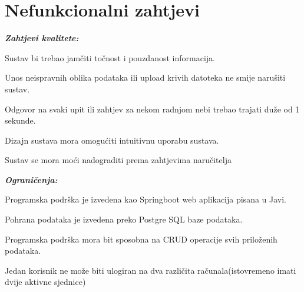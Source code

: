 				
	
		\section{Nefunkcionalni zahtjevi}
		
		    	\textbf{\textit{Zahtjevi kvalitete:}}\\
		 
		\begin{packed_item}
	
						\item Sustav bi trebao jamčiti točnost i pouzdanost informacija.
						\item  Unos neispravnih oblika podataka ili upload krivih datoteka ne smije narušiti sustav.
						\item Odgovor na svaki upit ili zahtjev za nekom radnjom nebi trebao trajati duže od 1 sekunde.
						\item  Dizajn sustava mora omogućiti intuitivnu uporabu sustava.
						\item Sustav se mora moći nadograditi prema zahtjevima naručitelja
						
					\end{packed_item}
				
			 
	    	\textbf{\textit{Ograničenja:}}\\
		 
			\begin{packed_item}
	
						\item Programska podrška je izvedena kao Springboot web aplikacija pisana u Javi.
						\item  Pohrana podataka je izvedena preko Postgre SQL baze podataka.
						\item Programska podrška mora bit sposobna na CRUD operacije svih priloženih podataka.
						\item  Jedan korisnik ne može biti ulogiran na dva različita računala(istovremeno imati dvije aktivne sjednice)
						
					\end{packed_item}
			 
			 
			 
	